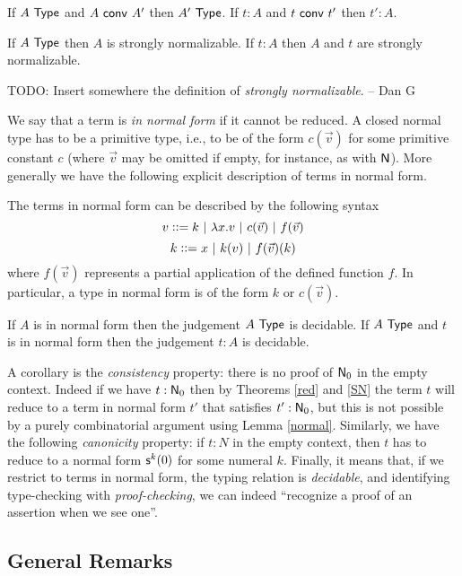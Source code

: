 {\begin{thm}\label{red}
If $A~{\sf Type}$ and $A ~{\sf conv}~ A'$ then $A'~{\sf Type}$.
If $t:A$ and $t ~{\sf conv}~ t'$ then $t':A$.
\end{thm}

\begin{thm}\label{SN}
 If $A~{\sf Type}$ then $A$ is strongly normalizable.
If $t:A$ then $A$ and $t$ are strongly normalizable. 
\end{thm}

TODO: Insert somewhere the definition of {\em strongly normalizable}. -- Dan G

 We say that a term is {\em in normal form} if it cannot be reduced.
A closed normal type has to be a primitive type, i.e., to be of the form $c(\vec{v})$ for some
primitive constant $c$ (where $\vec{v}$ may be omitted if empty, for instance, as with ${\sf N}$). 
More generally we have the following explicit description of terms in normal form.

\begin{lem}\label{normal}
The terms in normal form can be described by the following syntax
$$
v\vcentcolon\vcentcolon=  k~|~\lambda x.v~|~c(\vec{v})~|~f(\vec{v})
$$
$$
k\vcentcolon\vcentcolon= x~|~k(v)~|~f(\vec{v})(k)
$$
where $f(\vec{v})$ represents a partial application of the defined function $f$.
In particular, a type in normal form is of the form $k$ or $c(\vec{v})$.
\end{lem}

\begin{thm}
If $A$ is in normal form then the 
judgement $A~{\sf Type}$ is decidable. If $A~{\sf Type}$ and $t$ is in normal form then the judgement
$t:A$ is decidable.
\end{thm}


 A corollary is the {\em consistency} property: there is no proof of ${\sf N}_0$ in the empty
context. Indeed if we have $t:{\sf N}_0$ then by Theorems \ref{red} and \ref{SN} the term $t$ will reduce
to a term in normal form $t'$ that satisfies $t':{\sf N}_0$, but this is not possible by a 
purely combinatorial argument using Lemma \ref{normal}. Similarly, we have the following
{\em canonicity} property: if $t:N$ in the empty context, then $t$ has to reduce to a
normal form ${\sf s}^k(0)$ for some numeral $k$. Finally, it means that, if we restrict to terms
in normal form, the typing relation is {\em decidable}, and identifying type-checking with
{\em proof-checking}, we can indeed ``recognize a proof of an assertion when we see one''.

\subsection*{General Remarks}

}

